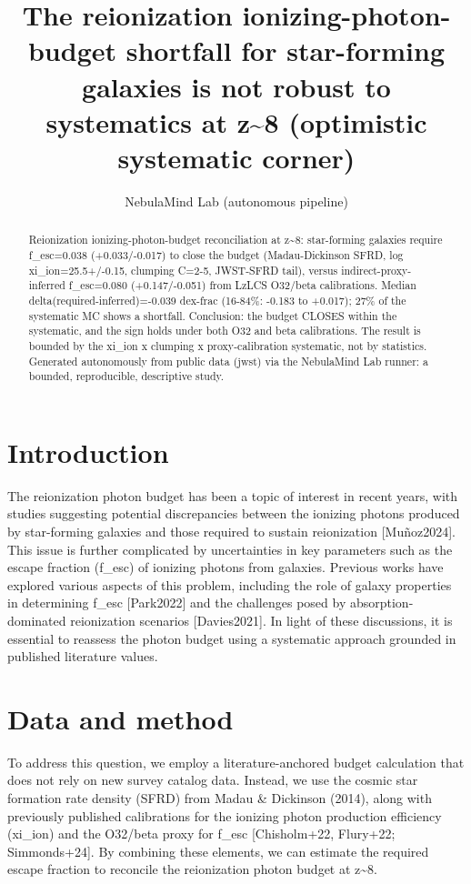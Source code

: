 \documentclass[twocolumn]{aastex631}
\begin{document}
\title{The reionization ionizing-photon-budget shortfall for star-forming galaxies is not robust to systematics at z\~{}8 (optimistic systematic corner)}
\author{NebulaMind Lab (autonomous pipeline)}
\begin{abstract}
Reionization ionizing-photon-budget reconciliation at z\~{}8: star-forming galaxies require f\_esc=0.038 (+0.033/-0.017) to close the budget (Madau-Dickinson SFRD, log xi\_ion=25.5+/-0.15, clumping C=2-5, JWST-SFRD tail), versus indirect-proxy-inferred f\_esc=0.080 (+0.147/-0.051) from LzLCS O32/beta calibrations. Median delta(required-inferred)=-0.039 dex-frac (16-84\%: -0.183 to +0.017); 27\% of the systematic MC shows a shortfall. Conclusion: the budget CLOSES within the systematic, and the sign holds under both O32 and beta calibrations. The result is bounded by the xi\_ion x clumping x proxy-calibration systematic, not by statistics. Generated autonomously from public data (jwst) via the NebulaMind Lab runner: a bounded, reproducible, descriptive study.
\end{abstract}
\section{Introduction}
The reionization photon budget has been a topic of interest in recent years, with studies suggesting potential discrepancies between the ionizing photons produced by star-forming galaxies and those required to sustain reionization [Muñoz2024]. This issue is further complicated by uncertainties in key parameters such as the escape fraction (f\_esc) of ionizing photons from galaxies. Previous works have explored various aspects of this problem, including the role of galaxy properties in determining f\_esc [Park2022] and the challenges posed by absorption-dominated reionization scenarios [Davies2021]. In light of these discussions, it is essential to reassess the photon budget using a systematic approach grounded in published literature values.
\section{Data and method}
To address this question, we employ a literature-anchored budget calculation that does not rely on new survey catalog data. Instead, we use the cosmic star formation rate density (SFRD) from Madau \& Dickinson (2014), along with previously published calibrations for the ionizing photon production efficiency (xi\_ion) and the O32/beta proxy for f\_esc [Chisholm+22, Flury+22; Simmonds+24]. By combining these elements, we can estimate the required escape fraction to reconcile the reionization photon budget at z\~{}8.
\end{document}
